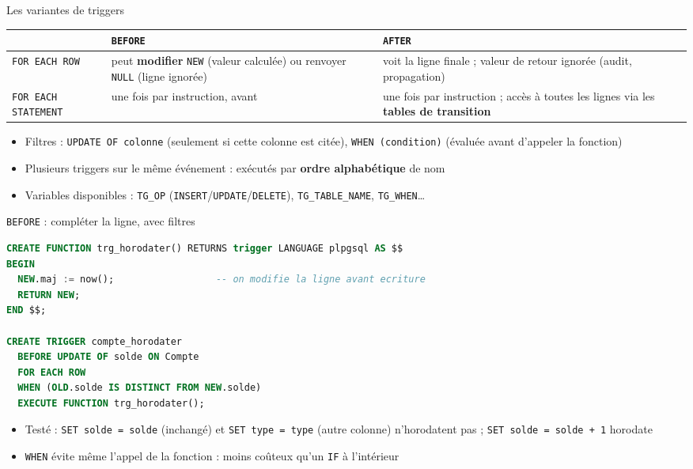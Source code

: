 \documentclass[aspectratio=169,10pt]{beamer}
\begin{document}
\begin{frame}{Les variantes de triggers}
  \begin{datacard}
    \small
    \begin{tabular}{@{}p{2.6cm}p{5cm}p{5cm}@{}}
      \toprule
       & \textbf{\texttt{BEFORE}} & \textbf{\texttt{AFTER}} \\
      \midrule
      \texttt{FOR EACH ROW} & peut \textbf{modifier} \texttt{NEW} (valeur calcul\'ee) ou renvoyer \texttt{NULL} (ligne ignor\'ee) & voit la ligne finale ; valeur de retour ignor\'ee (audit, propagation) \\
      \texttt{FOR EACH STATEMENT} & une fois par instruction, avant & une fois par instruction ; acc\`es \`a toutes les lignes via les \textbf{tables de transition} \\
      \bottomrule
    \end{tabular}
  \end{datacard}
  \vspace{2mm}
  \begin{itemize}
    \item Filtres : \texttt{UPDATE OF colonne} (seulement si cette colonne est cit\'ee), \texttt{WHEN (condition)} (\'evalu\'ee avant d'appeler la fonction)
    \item Plusieurs triggers sur le m\^eme \'ev\'enement : ex\'ecut\'es par \textbf{ordre alphab\'etique} de nom
    \item Variables disponibles : \texttt{TG\_OP} (\texttt{INSERT}/\texttt{UPDATE}/\texttt{DELETE}), \texttt{TG\_TABLE\_NAME}, \texttt{TG\_WHEN}\ldots
  \end{itemize}
\end{frame}

\begin{frame}[fragile]{\texttt{BEFORE} : compl\'eter la ligne, avec filtres}
\begin{lstlisting}[language=SQL]
CREATE FUNCTION trg_horodater() RETURNS trigger LANGUAGE plpgsql AS $$
BEGIN
  NEW.maj := now();                  -- on modifie la ligne avant ecriture
  RETURN NEW;
END $$;

CREATE TRIGGER compte_horodater
  BEFORE UPDATE OF solde ON Compte
  FOR EACH ROW
  WHEN (OLD.solde IS DISTINCT FROM NEW.solde)
  EXECUTE FUNCTION trg_horodater();
\end{lstlisting}
  \begin{itemize}
    \item Test\'e : \texttt{SET solde = solde} (inchang\'e) et \texttt{SET type = type} (autre colonne) n'horodatent pas ;
      \texttt{SET solde = solde + 1} horodate
    \item \texttt{WHEN} \'evite m\^eme l'appel de la fonction : moins co\^uteux qu'un \texttt{IF} \`a l'int\'erieur
  \end{itemize}
\end{frame}
\end{document}
